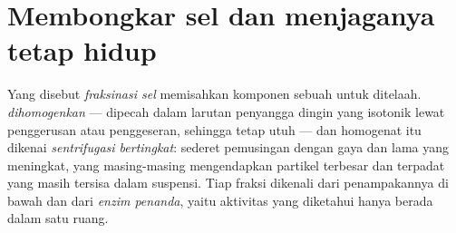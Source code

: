 \section{Membongkar sel dan menjaganya tetap hidup}

\begin{definition}\label{def:b1:cell-unit-of-life:fractionation}
Yang disebut \emph{fraksinasi sel} memisahkan
komponen sebuah  untuk ditelaah. 
\emph{dihomogenkan} ---  dipecah dalam larutan
penyangga dingin yang isotonik lewat penggerusan atau penggeseran,
sehingga  tetap utuh --- dan homogenat itu dikenai
\emph{sentrifugasi bertingkat}: sederet
pemusingan dengan gaya dan lama yang meningkat, yang masing-masing
mengendapkan partikel terbesar dan terpadat yang masih tersisa dalam
suspensi. Tiap fraksi dikenali dari penampakannya di bawah  dan dari \emph{enzim penanda}, yaitu
aktivitas yang diketahui hanya berada dalam satu ruang.
\end{definition}

